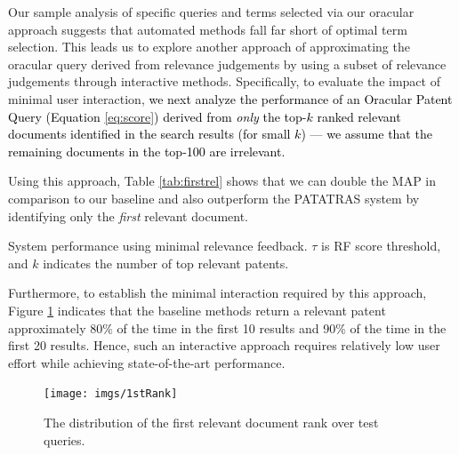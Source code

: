 Our sample analysis of specific queries and terms selected via our oracular
approach suggests that automated methods fall far short of optimal term selection.
This leads us to explore another approach of approximating the oracular query
derived from relevance judgements by using a subset of relevance judgements
through interactive methods.  Specifically, to evaluate the impact of minimal user interaction,
\textcolor{black}{we next analyze the performance of an Oracular Patent Query (Equation \ref{eq:score}) derived from
\emph{only} the top-$k$ ranked relevant documents identified in the search results (for small $k$) --- we assume that the remaining documents in the top-100 are irrelevant.}

Using this approach, Table \ref{tab:firstrel} shows that we can double the MAP in comparison to our baseline and also outperform the PATATRAS system by identifying only the \emph{first} relevant document.
\begin{table}[t!]
  \begin{center}
   \caption{System performance using minimal relevance feedback. $\tau$ is RF score threshold, and $k$ indicates the number of top relevant patents.}\vspace{3mm}
     
  \label{tab:firstrel}
  \end{center}  
\end{table}

Furthermore, to establish the minimal interaction required by this
approach, Figure \ref{fig:FirstTPRankHisto} indicates that the
baseline methods return a relevant patent approximately 80\% of the
time in the first 10 results and 90\% of the time in the first 20
results. Hence, such an interactive approach requires relatively low
user effort while achieving state-of-the-art performance.


\begin{figure}
\begin{centering}
\texttt{[image: imgs/1stRank]}
\par\end{centering}

\protect\caption{The distribution of the first relevant document rank over test queries.  
}
\label{fig:FirstTPRankHisto}
\end{figure}


